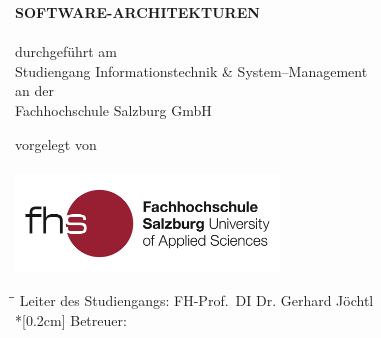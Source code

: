 \begin{titlepage}

\hspace{7cm}

\begin{center}
	{\Large\uppercase\expandafter{\bf Software-Architekturen}}\\[0.5ex]
	\vspace{1cm}
	\Large{\bf\large \Title}\\
	\vspace{1.5cm}
	\normalsize durchgeführt am\\
	Studiengang Informationstechnik \& System--Management\\
	an der\\
	Fachhochschule Salzburg GmbH\\
\end{center}

\vspace{2cm}

\begin{center}
	\normalsize vorgelegt von
	\\
	{
		\Large{\bf\large \Author}\\
	}
	\vspace{2cm}
	\includegraphics[width=7cm]{BilderAllgemein/Logo.jpg}\medskip
\end{center}
	
\vspace{2cm}

\begin{tabbing}
	\hspace*{3cm}\=\hspace*{5.5 cm}\= \kill
	\> Leiter des Studiengangs: \> FH-Prof.~DI Dr. Gerhard Jöchtl \\*[0.2cm]
	\> Betreuer: \> \Advisor \\
\end{tabbing}

\vfill	

\begin{center}
\VenueMonthYear\\
\end{center}
\end{titlepage}